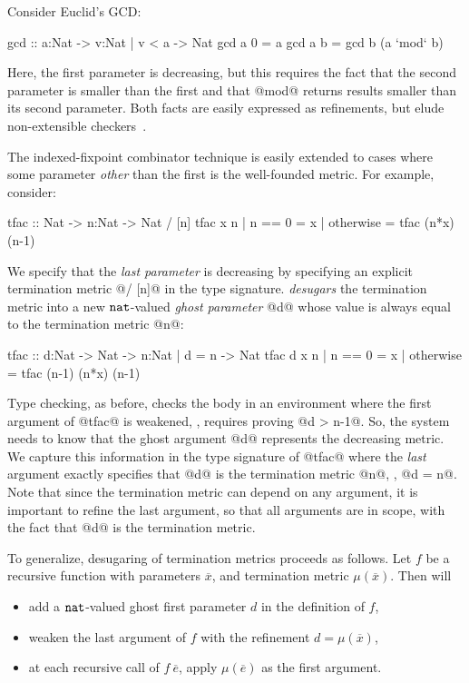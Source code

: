 Consider Euclid's GCD:
%
\begin{code}
  gcd :: a:Nat -> {v:Nat | v < a} -> Nat 
  gcd a 0 = a
  gcd a b = gcd b (a `mod` b)
\end{code}
%
Here, the first parameter is decreasing, but this requires
the fact that the second parameter is smaller than the first 
and that @mod@ returns results smaller than its second 
parameter. Both facts are easily expressed as refinements, 
but elude non-extensible checkers~\cite{Giesl11}.

The indexed-fixpoint combinator technique is easily extended to 
cases where some parameter \emph{other} than the first is the 
well-founded metric. For example, consider: 
%
\begin{code}
  tfac     :: Nat -> n:Nat -> Nat / [n] 
  tfac x n | n == 0    = x
           | otherwise = tfac (n*x) (n-1)
\end{code}
%
We specify that the \emph{last parameter} is decreasing by 
specifying an explicit termination metric @/ [n]@ in the 
type signature.
%
\toolname \emph{desugars} the 
termination metric into a new $\mathtt{nat}$-valued \emph{ghost parameter} @d@ 
whose value is always equal to the termination metric @n@:
\begin{code}
  tfac :: d:Nat -> Nat -> {n:Nat | d = n} -> Nat 
  tfac d x n | n == 0    = x
             | otherwise = tfac (n-1) (n*x) (n-1)
\end{code}
%
Type checking, as before, checks the body in an environment where 
the first argument of @tfac@ is weakened, \ie, requires proving @d > n-1@.
%
So, the system needs to know that the ghost argument @d@ 
represents the decreasing metric.
%
We capture this information in the type signature of @tfac@ where the \emph{last} 
argument exactly specifies that @d@ is the termination metric @n@, \ie, @d = n@.
%
Note that since the termination metric can depend on any argument, 
it is important to refine the last argument,
so that all arguments are in scope, with the fact that @d@ is the termination metric.

To generalize, desugaring of termination metrics proceeds as follows.
Let $f$ be a recursive function with parameters $\overline{x}$, and 
termination metric $\mu(\overline{x})$. Then \toolname will
\begin{itemize}
\item add a $\mathtt{nat}$-valued ghost first parameter $d$ in the definition of $f$, 
\item weaken the last argument of $f$ with the refinement $d = \mu(\overline{x})$, %
\item at each recursive call of $f\ \overline{e}$, 
apply $\mu(\overline{e})$ as the first argument.
\end{itemize}  
%

